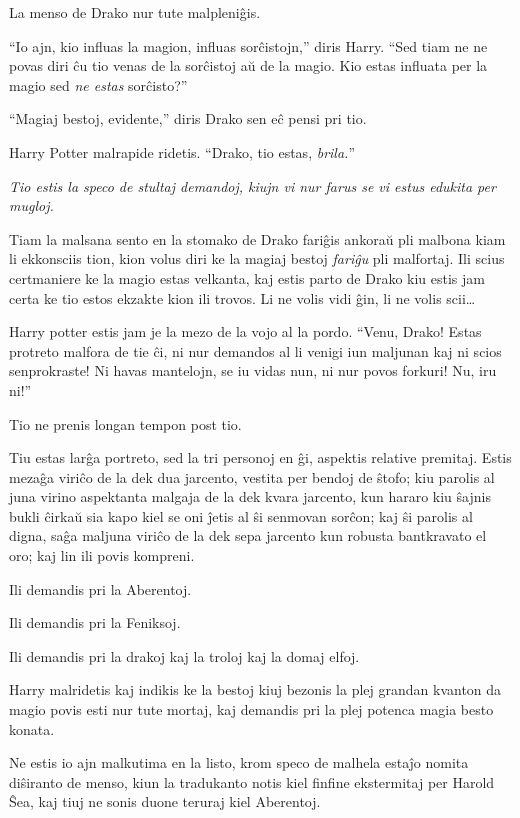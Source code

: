 La menso de Drako nur tute malpleniĝis.

``Io ajn, kio influas la magion, influas sorĉistojn,'' diris
Harry. ``Sed tiam ne ne povas diri ĉu tio venas de la sorĉistoj aŭ de
la magio. Kio estas influata per la magio sed \emph{ne estas}
sorĉisto?''

``Magiaj bestoj, evidente,'' diris Drako sen eĉ pensi pri tio.

Harry Potter malrapide ridetis. ``Drako, tio estas, \emph{brila.}''

\emph{Tio estis la speco de stultaj demandoj, kiujn vi nur farus se vi estus edukita per mugloj.}

Tiam la malsana sento en la stomako de Drako fariĝis ankoraŭ pli
malbona kiam li ekkonsciis tion, kion volus diri ke la magiaj bestoj
\emph{fariĝu} pli malfortaj. Ili scius certmaniere ke la magio estas
velkanta, kaj estis parto de Drako kiu estis jam certa ke tio estos
ekzakte kion ili trovos. Li ne volis vidi ĝin, li ne volis scii\ldots

Harry potter estis jam je la mezo de la vojo al la pordo. ``Venu,
Drako! Estas protreto malfora de tie ĉi, ni nur demandos al li venigi
iun maljunan kaj ni scios senprokraste! Ni havas mantelojn, se iu
vidas nun, ni nur povos forkuri! Nu, iru ni!''

\later

Tio ne prenis longan tempon post tio.

Tiu estas larĝa portreto, sed la tri personoj en ĝi, aspektis relative
premitaj. Estis mezaĝa viriĉo de la dek dua jarcento, vestita per
bendoj de ŝtofo; kiu parolis al juna virino aspektanta malgaja de la
dek kvara jarcento, kun hararo kiu ŝajnis bukli ĉirkaŭ sia kapo kiel
se oni ĵetis al ŝi senmovan sorĉon; kaj ŝi parolis al digna, saĝa
maljuna viriĉo de la dek sepa jarcento kun robusta bantkravato el oro;
kaj lin ili povis kompreni.

Ili demandis pri la Aberentoj.

Ili demandis pri la Feniksoj.

Ili demandis pri la drakoj kaj la troloj kaj la domaj elfoj.

Harry malridetis kaj indikis ke la bestoj kiuj bezonis la plej grandan
kvanton da magio povis esti nur tute mortaj, kaj demandis pri la plej
potenca magia besto konata.

Ne estis io ajn malkutima en la listo, krom speco de malhela estaĵo
nomita diŝiranto de menso, kiun la tradukanto notis kiel finfine
ekstermitaj per Harold Ŝea, kaj tiuj ne sonis duone teruraj kiel
Aberentoj.

